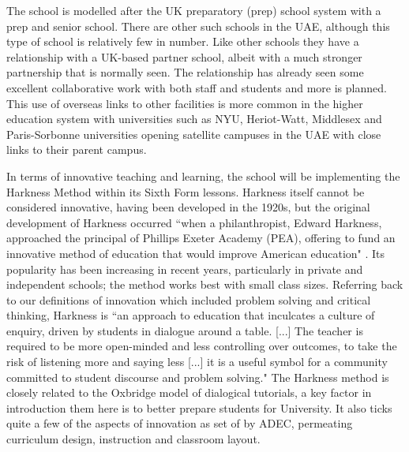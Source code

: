 \documentclass[11pt]{article}
\begin{document}
The school is modelled after the UK preparatory (prep) school system with a prep and senior school. There are other such schools in the UAE, although this type of school is relatively few in number. Like other schools they have a relationship with a UK-based partner school, albeit with a much stronger partnership that is normally seen. The relationship has already seen some excellent collaborative work with both staff and students and  more is planned. This use of overseas links to other facilities is more common in the higher education system with universities such as NYU, Heriot-Watt, Middlesex and Paris-Sorbonne universities opening satellite campuses in the UAE with close links to their parent campus.

In terms of innovative teaching and learning, the school will be implementing the Harkness Method within its Sixth Form lessons. Harkness itself cannot be considered innovative, having been developed in the 1920s, but the original development of Harkness occurred ``when a philanthropist, Edward Harkness, approached the principal of Phillips Exeter Academy (PEA), offering to fund an innovative method of education that would improve American education" \cite[p. 182]{Sevigny2016}. Its popularity has been increasing in recent years, particularly in private and independent schools; the method works best with small class sizes. Referring back to our definitions of innovation which included problem solving and critical thinking, Harkness is ``an approach to education that inculcates a culture of enquiry, driven by students in dialogue around a table. [...] The teacher is required to be more open-minded and less controlling over outcomes, to take the risk of listening more and saying less [...] it is a useful symbol for a community committed to student discourse and problem solving." \citep{Williams2010} The Harkness method is closely related to the Oxbridge model of dialogical tutorials, a key factor in introduction them here is to better prepare students for University. It also ticks quite a few of the aspects of innovation as set of by ADEC, permeating curriculum design, instruction and classroom layout. 
\end{document}
